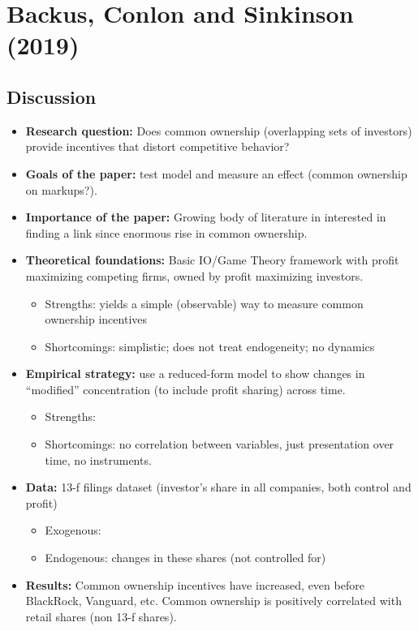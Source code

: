 \section{Backus, Conlon and Sinkinson (2019)}

\subsection{Discussion}

\begin{itemize}
\item \textbf{Research question:} Does common ownership (overlapping sets of investors) provide incentives that distort competitive behavior?
\item \textbf{Goals of the paper:} test model and measure an effect (common ownership on markups?).
\item \textbf{Importance of the paper:} Growing body of literature in interested in finding a link since enormous rise in common ownership.
\item \textbf{Theoretical foundations:}  Basic IO/Game Theory framework with profit maximizing competing firms, owned by profit maximizing investors. \begin{itemize}
\item Strengths: yields a simple (observable) way to measure common ownership incentives
\item Shortcomings: simplistic; does not treat endogeneity; no dynamics
\end{itemize}
\item \textbf{Empirical strategy:} use a reduced-form model to show changes in ``modified'' concentration (to include profit sharing) across time.\begin{itemize}
\item Strengths: 
\item Shortcomings: no correlation between variables, just presentation over time, no instruments.
\end{itemize}
\item \textbf{Data:} 13-f filings dataset (investor's share in all companies, both control and profit)
\begin{itemize}
\item Exogenous: 
\item Endogenous: changes in these shares (not controlled for)
\end{itemize}
\item \textbf{Results:} Common ownership incentives have increased, even before BlackRock, Vanguard, etc. Common ownership is positively correlated with retail shares (non 13-f shares).
\end{itemize}